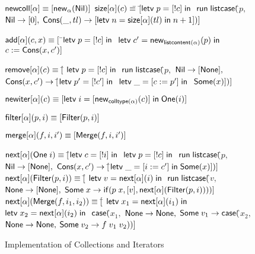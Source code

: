 \begin{figure}
\mbox{}
\begin{specification}
$\mathsf{newcoll}[\alpha] \equiv [\mathsf{new}_{\alpha}(\mathsf{Nil})]$ 
$\mathsf{size}[\alpha](c) \equiv $\=
         $[$\=$\mathsf{letv}\;p = [!c]\;\mathsf{in}\;$ 
\nextline\> \>$\mathsf{run}\;
               \mathsf{listcase}($\=$p,$ 
\nextline\> \>                   \>$\mathsf{Nil} \to [0],$
\nextline\> \>                   \>$\mathsf{Cons}(\_, tl) \to 
                                     [\mathsf{letv}\;n = \mathsf{size}[\alpha](tl)\;\mathsf{in}\;n+1])]$

$\mathsf{add}[\alpha](c, x) \equiv [$
          \=$\mathsf{letv}\;p = [!c]\;\mathsf{in}\;$ 
\nextline \>$\mathsf{letv}\;c' = \mathsf{new}_{\mathsf{listcontent}(\alpha)}(p)\;\mathsf{in}\;$ 
\nextline \>$c := \mathsf{Cons}(x, c')]$ 

$\mathsf{remove}[\alpha](c) \equiv [$\=
            $\mathsf{letv}\;p = [!c]\;\mathsf{in}\;$ 
\nextline \>$\mathsf{run}\;\mathsf{listcase}($\=$p,$ 
\nextline \>                                \>$\mathsf{Nil} \to [\mathsf{None}],$ 
\nextline \>                                \>$\mathsf{Cons}(x, c') \to [$\=$\mathsf{letv}\;p' = [!c']\;\mathsf{in}\;$ 
\nextline \>                                \> \>$\mathsf{letv}\;\_ = [c := p']\;\mathsf{in}\;$ 
\nextline \>                                \> \>$\mathsf{Some}(x)])]$

$\mathsf{newiter}[\alpha](c) \equiv [\mathsf{letv}\;i = [\mathsf{new}_{\mathsf{colltype}(\alpha)}(c)]\;\mathsf{in}\;\mathsf{One}(i)]$

$\mathsf{filter}[\alpha](p, i) \equiv [\mathsf{Filter}(p, i)]$

$\mathsf{merge}[\alpha](f, i, i') \equiv [\mathsf{Merge}(f, i, i')]$ 

$\mathsf{next}[\alpha](\mathsf{One}\;i) \equiv [$\=$\mathsf{letv}\;c = [!i]\;\mathsf{in}\;$ 
\nextline \> $\mathsf{letv}\;p = [!c]\;\mathsf{in}\;$ 
\nextline \> $\mathsf{run}\;\mathsf{listcase}($\=$p,$ 
\nextline \>                                  \>$\mathsf{Nil} \to [\mathsf{None}],$ 
\nextline \>                                  \>$\mathsf{Cons}(x, c') \to [$\=$\mathsf{letv}\;\_ = [i := c']\;\mathsf{in}\;\mathsf{Some}(x)])]$ 
$\mathsf{next}[\alpha](\mathsf{Filter}(p, i)) \equiv [$\= 
           $\letv{v}{\nextiter[\alpha](i)}$ 
\nextline\>$\mathsf{run}\;\mathsf{listcase}($\=$v,$ 
\nextline\>\> $\mathsf{None} \to [\mathsf{None}],$ 
\nextline\>\> $\mathsf{Some}\;x \to \mathsf{if}({p\;x}, {[v]}, {\mathsf{next}[\alpha](\mathsf{Filter}(p,i))}))]$ 
$\mathsf{next}[\alpha](\mathsf{Merge}(f, i_1, i_2)) \equiv [$\=
            $\mathsf{letv}\;x_1 = \mathsf{next}[\alpha](i_1)\;\mathsf{in}\;$ 
\nextline\> $\mathsf{letv}\;x_2 = \mathsf{next}[\alpha](i_2)\;\mathsf{in}\;$ 
\nextline\> $\mathsf{case}($\=$x_1,$ 
\nextline\> \>           $\mathsf{None} \to \mathsf{None},$ 
\nextline\> \>           $\mathsf{Some}\;v_1 \to \mathsf{case}($\=$x_2,$ 
\nextline\> \> \>                                 $\mathsf{None} \to \mathsf{None},$
\> \> \>                                 $\mathsf{Some}\;v_2 \to f\;v_1\;v_2))]$
                                                   
\end{specification}
\caption{Implementation of Collections and Iterators}
\label{iterator-implementation}
\end{figure}


